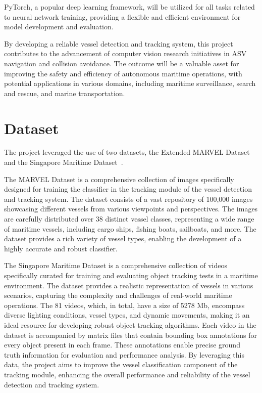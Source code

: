\documentclass[a4paper,12pt]{article}
\begin{document}
\begin{multicols}{2}
PyTorch, a popular deep learning framework, will be utilized for all tasks related to neural network training, providing a flexible and efficient environment for model development and evaluation.

By developing a reliable vessel detection and tracking system, this project contributes to the advancement of computer vision research initiatives in ASV navigation and collision avoidance.
The outcome will be a valuable asset for improving the safety and efficiency of autonomous maritime operations, with potential applications in various domains, including maritime surveillance, search and rescue, and marine transportation.

\section{Dataset}\label{sec:dataset}
The project leveraged the use of two datasets, the Extended MARVEL Dataset~\cite{MARVEL} and the Singapore Maritime Dataset~\cite{SINGAPORE}.

The MARVEL Dataset is a comprehensive collection of images specifically designed for training the classifier in the tracking module of the vessel detection and tracking system.
The dataset consists of a vast repository of 100,000 images showcasing different vessels from various viewpoints and perspectives.
The images are carefully distributed over 38 distinct vessel classes, representing a wide range of maritime vessels, including cargo ships, fishing boats, sailboats, and more.
The dataset provides a rich variety of vessel types, enabling the development of a highly accurate and robust classifier.

The Singapore Maritime Dataset is a comprehensive collection of videos specifically curated for training and evaluating object tracking tests in a maritime environment.
The dataset provides a realistic representation of vessels in various scenarios, capturing the complexity and challenges of real-world maritime operations.
The 81 videos, which, in total, have a size of 5278 Mb, encompass diverse lighting conditions, vessel types, and dynamic movements, making it an ideal resource for developing robust object tracking algorithms.
Each video in the dataset is accompanied by matrix files that contain bounding box annotations for every object present in each frame.
These annotations enable precise ground truth information for evaluation and performance analysis.
By leveraging this data, the project aims to improve the vessel classification component of the tracking module, enhancing the overall performance and reliability of the vessel detection and tracking system.


\end{multicols}
\end{document}
